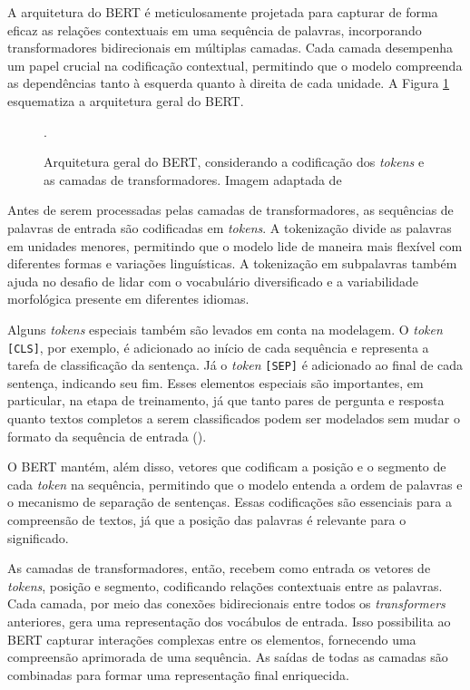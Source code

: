 A arquitetura do BERT é meticulosamente projetada para capturar de forma eficaz as relações contextuais em uma sequência de palavras, incorporando transformadores bidirecionais em múltiplas camadas. Cada camada desempenha um papel crucial na codificação contextual, permitindo que o modelo compreenda as dependências tanto à esquerda quanto à direita de cada unidade. A Figura \ref{fig:bert_architecture} esquematiza a arquitetura geral do BERT.

\begin{figure}[H]
    \centering
    \caption{Arquitetura geral do BERT, considerando a codificação dos \textit{tokens} e as camadas de transformadores. Imagem adaptada de \cite{cui-etal-2022-deep}}.
    \label{fig:bert_architecture}
    
\end{figure}

Antes de serem processadas pelas camadas de transformadores, as sequências de palavras de entrada são codificadas em \textit{tokens}. A tokenização divide as palavras em unidades menores, permitindo que o modelo lide de maneira mais flexível com diferentes formas e variações linguísticas. A tokenização em subpalavras também ajuda no desafio de lidar com o vocabulário diversificado e a variabilidade morfológica presente em diferentes idiomas.

Alguns \textit{tokens} especiais também são levados em conta na modelagem. O \textit{token} \texttt{[CLS]}, por exemplo, é adicionado ao início de cada sequência e representa a tarefa de classificação da sentença. Já o \textit{token} \texttt{[SEP]} é adicionado ao final de cada sentença, indicando seu fim. Esses elementos especiais são importantes, em particular, na etapa de treinamento, já que tanto pares de pergunta e resposta quanto textos completos a serem classificados podem ser modelados sem mudar o formato da sequência de entrada (\cite{bert2018}).

O BERT mantém, além disso, vetores que codificam a posição e o segmento de cada \textit{token} na sequência, permitindo que o modelo entenda a ordem de palavras e o mecanismo de separação de sentenças. Essas codificações são essenciais para a compreensão de textos, já que a posição das palavras é relevante para o significado.

As camadas de transformadores, então, recebem como entrada os vetores de \textit{tokens}, posição e segmento, codificando relações contextuais entre as palavras. Cada camada, por meio das conexões bidirecionais entre todos os \textit{transformers} anteriores, gera uma representação dos vocábulos de entrada. Isso possibilita ao BERT capturar interações complexas entre os elementos, fornecendo uma compreensão aprimorada de uma sequência. As saídas de todas as camadas são combinadas para formar uma representação final enriquecida.

